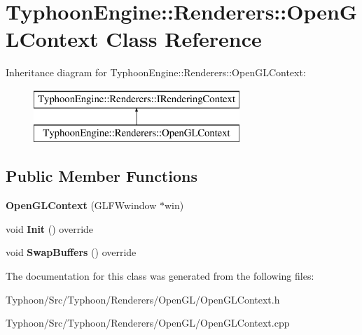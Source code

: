 \hypertarget{class_typhoon_engine_1_1_renderers_1_1_open_g_l_context}{}\section{Typhoon\+Engine\+::Renderers\+::Open\+G\+L\+Context Class Reference}
\label{class_typhoon_engine_1_1_renderers_1_1_open_g_l_context}
Inheritance diagram for Typhoon\+Engine\+::Renderers\+::Open\+G\+L\+Context\+:\begin{figure}[H]
\begin{center}
\leavevmode
\includegraphics[height=2.000000cm]{class_typhoon_engine_1_1_renderers_1_1_open_g_l_context}
\end{center}
\end{figure}
\subsection*{Public Member Functions}
\begin{DoxyCompactItemize}
\item 
\mbox{\label{class_typhoon_engine_1_1_renderers_1_1_open_g_l_context_a98a463b7d21f4c49df5580e8f488cfe9}} 
{\bfseries Open\+G\+L\+Context} (G\+L\+F\+Wwindow $\ast$win)
\item 
\mbox{\label{class_typhoon_engine_1_1_renderers_1_1_open_g_l_context_a9e2306a47793721353caa5f33a2c5932}} 
void {\bfseries Init} () override
\item 
\mbox{\label{class_typhoon_engine_1_1_renderers_1_1_open_g_l_context_a11a9de8b2fb5592ae895de315671b3ab}} 
void {\bfseries Swap\+Buffers} () override
\end{DoxyCompactItemize}


The documentation for this class was generated from the following files\+:\begin{DoxyCompactItemize}
\item 
Typhoon/\+Src/\+Typhoon/\+Renderers/\+Open\+G\+L/Open\+G\+L\+Context.\+h\item 
Typhoon/\+Src/\+Typhoon/\+Renderers/\+Open\+G\+L/Open\+G\+L\+Context.\+cpp\end{DoxyCompactItemize}
